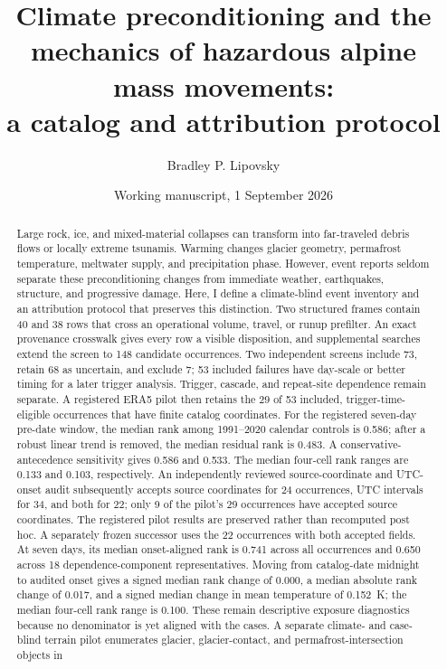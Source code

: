 \documentclass[11pt]{article}
\title{Climate preconditioning and the mechanics of hazardous alpine mass movements:\\a catalog and attribution protocol}
\author{Bradley P. Lipovsky}
\date{Working manuscript, 1 September 2026}
\begin{document}
\maketitle

\begin{abstract}
Large rock, ice, and mixed-material collapses can transform into far-traveled
debris flows or locally extreme tsunamis. Warming changes glacier geometry,
permafrost temperature, meltwater supply, and precipitation phase. However,
event reports seldom separate these preconditioning changes from immediate
weather, earthquakes, structure, and progressive damage. Here, I define a
climate-blind event inventory and an attribution protocol that preserves this
distinction. Two structured frames contain 40 and 38 rows that cross an
operational volume, travel, or runup prefilter. An exact provenance crosswalk
gives every row a visible disposition, and supplemental searches extend the
screen to 148 candidate occurrences. Two independent screens include 73,
retain 68 as uncertain, and exclude 7; 53 included failures have day-scale or
better timing for a later trigger analysis. Trigger, cascade, and repeat-site
dependence remain separate. A registered ERA5 pilot then retains the 29 of 53
included, trigger-time-eligible occurrences that have finite catalog
coordinates. For the
registered seven-day pre-date window, the median rank among 1991--2020
calendar controls is 0.586; after a robust linear trend is removed, the median
residual rank is 0.483. A conservative-antecedence sensitivity gives 0.586 and
0.533. The median four-cell rank ranges are 0.133 and 0.103, respectively.
An independently reviewed source-coordinate and UTC-onset audit subsequently
accepts source coordinates for 24 occurrences, UTC intervals for 34, and both
for 22; only 9 of the pilot's 29 occurrences have accepted source coordinates.
The registered pilot results are preserved rather than recomputed post hoc. A
separately frozen successor uses the 22 occurrences with both accepted fields.
At seven days, its median onset-aligned rank is 0.741 across all occurrences
and 0.650 across 18 dependence-component representatives. Moving from
catalog-date midnight to audited onset gives a signed median rank change of
0.000, a median absolute rank change of 0.017, and a signed median change in
mean temperature of 0.152~K; the median four-cell rank range is 0.100. These
remain descriptive exposure diagnostics because no denominator
is yet aligned with the cases. A separate climate- and case-blind terrain pilot
enumerates glacier, glacier-contact, and permafrost-intersection objects in

\end{abstract}
\end{document}
